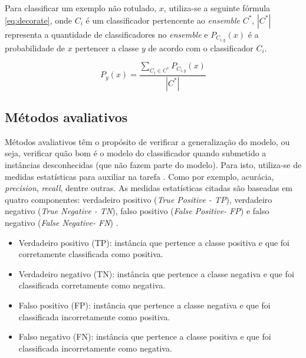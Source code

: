 Para classificar um exemplo não rotulado, $x$, utiliza-se a seguinte fórmula \ref{eq:decorate}, onde $C_{i}$ é um classificador pertencente ao \textit{ensemble} $C^*$, $|C^*|$ representa a quantidade de classificadores no \textit{ensemble} e $P_{C_{i,y}}(x)$ é a probabilidade de $x$ pertencer a classe $y$ de acordo com o classificador $C_{i}$.

\begin{equation}
  P_{y}(x) = \frac{\sum_{C_{i} \in C^*}P_{C_{i,y}}(x)}{|C^*|}
  \label{eq:decorate}
\end{equation}

\subsection{Métodos avaliativos}
\label{subsec:evaluationMethods}
Métodos avaliativos têm o propósito de verificar a generalização do modelo, ou seja, verificar quão bom é o modelo do classificador quando submetido a instâncias desconhecidas (que não fazem parte do modelo). Para isto, utiliza-se de medidas estatísticas para auxiliar na tarefa \cite{Witten:2005}. Como por exemplo, acurácia, \textit{precision}, \textit{recall}, dentre outras. As medidas estatísticas citadas são baseadas em quatro componentes: verdadeiro positivo (\textit{True Positive - TP}), verdadeiro negativo (\textit{True Negative - TN}), falso positivo (\textit{False Positive- FP}) e falso negativo (\textit{False Negative- FN}) \cite{Davis:2006}.

\begin{itemize}
\item Verdadeiro positivo (TP): instância que pertence a classe positiva e que foi corretamente classificada como positiva.
\item Verdadeiro negativo (TN): instância que pertence a classe negativa e que foi classificada corretamente como negativa.
\item Falso positivo (FP): instância que pertence a classe negativa e que foi classificada  incorretamente como positiva.
\item Falso negativo (FN): instância que pertence a classe positiva e que foi classificada incorretamente como negativa.
\end{itemize}

